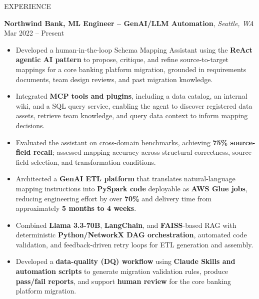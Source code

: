 \documentclass{resume} %
\begin{document}
\vspace{-0.2em}
\begin{rSection}{EXPERIENCE}

\textbf{Northwind Bank, ML Engineer – GenAI/LLM Automation}, \textit{Seattle, WA} \hfill Mar 2022 – Present
\vspace{-0.5em}

\begin{itemize}
\itemsep -3pt {}
\item Developed a human-in-the-loop Schema Mapping Assistant using the \textbf{ReAct agentic AI pattern} to propose, critique, and refine source-to-target mappings for a core banking platform migration, grounded in requirements documents, team design reviews, and past migration knowledge.

\item Integrated \textbf{MCP tools and plugins}, including a data catalog, an internal wiki, and a SQL query service, enabling the agent to discover registered data assets, retrieve team knowledge, and query data context to inform mapping decisions.

\item Evaluated the assistant on cross-domain benchmarks, achieving \textbf{75\% source-field recall}; assessed mapping accuracy across structural correctness, source-field selection, and transformation conditions.

\item Architected a \textbf{GenAI ETL platform} that translates natural-language mapping instructions into \textbf{PySpark code} deployable as \textbf{AWS Glue jobs}, reducing engineering effort by over \textbf{70\%} and delivery time from approximately \textbf{5 months to 4 weeks}.

\item Combined \textbf{Llama 3.3-70B}, \textbf{LangChain}, and \textbf{FAISS}-based RAG with deterministic \textbf{Python/NetworkX DAG orchestration}, automated code validation, and feedback-driven retry loops for ETL generation and assembly.

\item Developed a \textbf{data-quality (DQ) workflow} using \textbf{Claude Skills and automation scripts} to generate migration validation rules, produce \textbf{pass/fail reports}, and support \textbf{human review} for the core banking platform migration.
\end{itemize}


\end{rSection}
\end{document}
